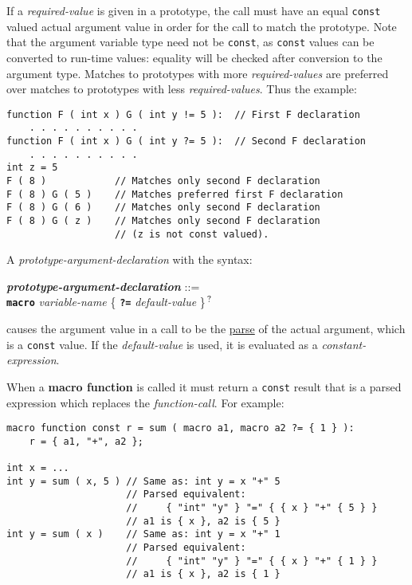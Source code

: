 \documentclass[12pt]{article}
\newcommand{\TT}[1]{{\tt \bfseries #1}}
\newcommand{\QMARK}{{$^{\,\mbox{\footnotesize ?}}$}}
\newcommand{\key}[1]{{\rm \bfseries #1}}
\newcommand{\emkey}[1]{{\em \bfseries #1}}
\newenvironment{indpar}[1][0.3in]%
	{\begin{list}{}%
		     {\setlength{\itemsep}{0in}%
		      \setlength{\topsep}{0in}%
		      \setlength{\parsep}{1ex}%
		      \setlength{\labelwidth}{#1}%
		      \setlength{\leftmargin}{#1}%
		      \addtolength{\leftmargin}{\labelsep}}%
	 \item}%
	{\end{list}}
\begin{document}
If a {\em required-value} is given in a prototype, the call must
have an equal {\tt const} valued actual argument value
in order for the call to match the prototype.
Note that the argument variable type need not be {\tt const},
as {\tt const} values can be converted to run-time values:
equality will be checked after conversion to the argument type.
Matches to prototypes with more {\em required-values}
are preferred over matches to prototypes with less {\em required-values}.
Thus the example:
\begin{indpar}\begin{verbatim}
function F ( int x ) G ( int y != 5 ):  // First F declaration
    . . . . . . . . . .
function F ( int x ) G ( int y ?= 5 ):  // Second F declaration
    . . . . . . . . . .
int z = 5
F ( 8 )            // Matches only second F declaration
F ( 8 ) G ( 5 )    // Matches preferred first F declaration
F ( 8 ) G ( 6 )    // Matches only second F declaration
F ( 8 ) G ( z )    // Matches only second F declaration
                   // (z is not const valued).
\end{verbatim}\end{indpar}

A {\em prototype-argument-declaration} with the syntax:
\begin{indpar}
\emkey{prototype-argument-declaration}\label{MACRO-ARGUMENT-DECLARATION} ::= \\
\hspace*{1in} \TT{macro} {\em variable-name}
                         \{ \TT{?=} {\em default-value} \}\QMARK{}
\end{indpar}
causes the argument value in a call to be the \underline{parse}
of the actual argument, which is a {\tt const} value.  If the
{\em default-value} is used, it is evaluated as a {\em constant-expression}.

When a \key{macro function} is called it must return a {\tt const} result
that is a parsed expression which replaces
the {\em function-call}.  For example:
\begin{indpar}\begin{verbatim}
macro function const r = sum ( macro a1, macro a2 ?= { 1 } ):
    r = { a1, "+", a2 };

int x = ...
int y = sum ( x, 5 ) // Same as: int y = x "+" 5
                     // Parsed equivalent:
                     //     { "int" "y" } "=" { { x } "+" { 5 } }
                     // a1 is { x }, a2 is { 5 }
int y = sum ( x )    // Same as: int y = x "+" 1
                     // Parsed equivalent:
                     //     { "int" "y" } "=" { { x } "+" { 1 } }
                     // a1 is { x }, a2 is { 1 }
\end{verbatim}\end{indpar}
\end{document}
